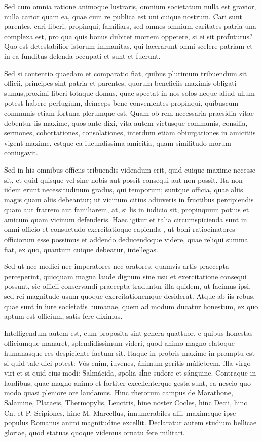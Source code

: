  Sed cum omnia ratione animoque lustraris, omnium societatum nulla est gravior, nulla carior quam ea, quae cum re publica est uni cuique nostrum. Cari sunt parentes, cari liberi, propinqui, familiars, sed omnes omnium caritates patria una complexa est, pro qua quis bonus dubitet mortem oppetere, si ei sit profuturus? Quo est detestabilior istorum immanitas, qui lacerarunt omni scelere patriam et in ea funditus delenda occupati et sunt et fuerunt.

 Sed si contentio quaedam et comparatio fiat, quibus plurimum tribuendum sit officii, principes sint patria et parentes, quorum beneficiis maximis obligati sumus,proximi liberi totaque domus, quae spectat in nos solos neque aliud ullum potest habere perfugium, deinceps bene convenientes propinqui, quibuscum communis etiam fortuna plerumque est. Quam ob rem necessaria praesidia vitae debentur iis maxime, quos ante dixi, vita autem victusque communis, consilia, sermones, cohortationes, consolationes, interdum etiam obiurgationes in amicitiis vigent maxime, estque ea iucundissima amicitia, quam similitudo morum coniugavit.

 Sed in his omnibus officiis tribuendis videndum erit, quid cuique maxime necesse sit, et quid quisque vel sine nobis aut possit consequi aut non possit. Ita non iidem erunt necessitudinum gradus, qui temporum; suntque officia, quae aliis magis quam aliis debeantur; ut vicinum citius adiuveris in fructibus percipiendis quam aut fratrem aut familiarem, at, si lis in iudicio sit, propinquum potius et amicum quam vicinum defenderis. Haec igitur et talia circumspicienda sunt in omni officio et consuetudo exercitatioque capienda , ut boni ratiocinatores officiorum esse possimus et addendo deducendoque videre, quae reliqui summa fiat, ex quo, quantum cuique debeatur, intellegas.

 Sed ut nec medici nec imperatores nec oratores, quamvis artis praecepta perceperint, quicquam magna laude dignum sine usu et exercitatione consequi possunt, sic officii conservandi praecepta traduntur illa quidem, ut facimus ipsi, sed rei magnitude usum quoque exercitationemque desiderat. Atque ab iis rebus, quae sunt in iure societatis humanae, quem ad modum ducatur honestum, ex quo aptum est officium, satis fere diximus.

 Intelligendum autem est, cum proposita sint genera quattuor, e quibus honestas officiumque manaret, splendidissimum videri, quod animo magno elatoque humanasque res despiciente factum sit. Itaque in probris maxime in promptu est si quid tale dici potest: Vós enim, iuvenes, ánimum geritis múliebrem, ílla virgo viri et si quid eius modi: Salmácida, spolia sÍne sudore et sánguine. Contraque in laudibus, quae magno animo et fortiter excellenterque gesta sunt, ea nescio quo modo quasi pleniore ore laudamus. Hinc rhetorum campus de Marathone, Salamine, Plataeis, Thermopylis, Leuctris, hine noster Cocles, hinc Decii, hinc Cn. et P. Scipiones, hinc M. Marcellus, innumerabiles alii, maximeque ipse populus Romanus animi magnitudine excellit. Declaratur autem studium bellicae gloriae, quod statuas quoque videmus ornatu fere militari.

